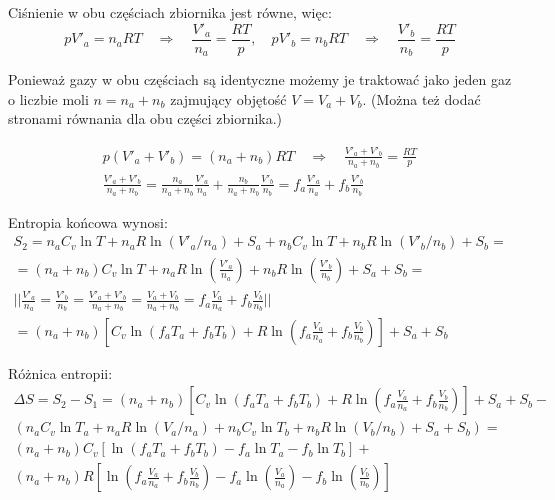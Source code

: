 \documentclass[11pt,a4paper]{article}
\begin{document}
Ciśnienie w obu częściach zbiornika jest równe, więc:
\begin{equation}
  pV'_a = n_a R T \quad \Rightarrow \quad \frac{V'_a}{n_a} = \frac{R T}{p}, \quad
  pV'_b = n_b R T \quad \Rightarrow \quad \frac{V'_b}{n_b} = \frac{R T}{p}
\end{equation}

Ponieważ gazy w obu częściach są identyczne możemy je traktować jako jeden gaz
o liczbie moli $n =n_a + n_b$ zajmujący objętość $V=V_a + V_b$. 
(Można też dodać stronami równania dla obu części zbiornika.)

\begin{align*}
p(V'_a + V'_b) = (n_a + n_b) R T \quad \Rightarrow \quad \frac{V'_a + V'_b}{n_a + n_b} = \frac{R T}{p} \\
\frac{V'_a + V'_b}{n_a + n_b} = \frac{n_a}{n_a + n_b} \frac{V'_a}{n_a} + \frac{n_b}{n_a + n_b} \frac{V'_b}{n_b} = f_a \frac{V'_a}{n_{a}} + f_b \frac{V'_b}{n_{b}}
\end{align*}


Entropia końcowa wynosi:
\begin{align*}
S_2 = n_a C_v \ln T  + n_a R \ln (V'_a/n_a)  + S_{a} + n_b C_v \ln T  + n_b R \ln (V'_b/n_b)  + S_{b} = \\
= (n_a + n_b) C_v \ln T + n_a R \ln \left(\frac{V'_a}{n_a}\right) + n_b R \ln \left(\frac{V'_b}{n_b}\right) + S_{a} + S_{b} = \\
|| \frac{V'_a}{n_a} = \frac{V'_b}{n_b}  = 
    \frac{V'_a + V'_b}{n_a + n_b} = 
    \frac{V_a + V_b}{n_a + n_b} = 
    f_a\frac{V_a}{n_a} + f_b\frac{V_b}{n_b}
    || \\
= (n_a + n_b) \left[C_v \ln (f_a T_a + f_b T_b) + 
                    R \ln \left( f_a\frac{V_a}{n_a} + f_b\frac{V_b}{n_b}  \right)
 \right]  + S_{a} + S_{b}
\end{align*}


Różnica entropii:
\begin{align*}
\Delta S  =S_2 - S_1 = 
(n_a + n_b) \left[C_v \ln (f_a T_a + f_b T_b) + 
R \ln \left( f_a\frac{V_a}{n_a} + f_b\frac{V_b}{n_b}  \right)
 \right]  + S_{a} + S_{b} - \\ 
 \left(
      n_a C_v \ln T_a  + n_a R \ln (V_a/n_a)  +  
      n_b C_v \ln T_b  + n_b R \ln (V_b/n_b)  + 
      S_{a} + S_{b} 
      \right) = \\
            (n_a + n_b)C_v \left[\ln (f_a T_a + f_b T_b) -
            f_a \ln T_a  - f_b \ln T_b \right] + \\
            (n_a + n_b)R \left[\ln \left( f_a\frac{V_a}{n_a} + f_b\frac{V_b}{n_b}  \right) -
                          f_a\ln (\frac{V_a}{n_a})  - f_b \ln (\frac{V_b}{n_b}) \right]
\end{align*}
\end{document}
